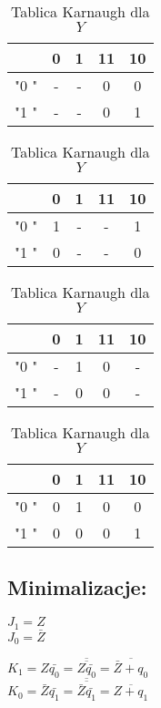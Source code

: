 \documentclass[12pt,a4paper]{article}
\begin{document}
\begin{table}[H]
\begin{minipage}{.5\textwidth}
				\caption{Tablica Karnaugh dla $K_1$}
				\vspace{0.2cm}
				\centering
				\begin{tabular}{c|c|c|c|c}
					\backslashbox{$Z$}{$q_1q_0$}	&	0	&	1	&	11	&	10	\\\hline
					"0	"	&	-	&	-	&	0	&	0	\\\hline
					"1	"	&	-	&	-	&	0	&	1	
				\end{tabular}
			\vspace{1cm}
			
				\caption{Tablica Karnaugh dla $J_0$}
				\vspace{0.2cm}
				\centering
				\begin{tabular}{c|c|c|c|c}
					\backslashbox{$Z$}{$q_1q_0$}	&	0	&	1	&	11	&	10	\\\hline
					"0	"	&	1	&	-	&	-	&	1	\\\hline
					"1	"	&	0	&	-	&	-	&	0	
				\end{tabular}
				
				\caption{Tablica Karnaugh dla $K_0$}
				\vspace{0.2cm}
				\centering
				\begin{tabular}{c|c|c|c|c}
					\backslashbox{$Z$}{$q_1q_0$}	&	0	&	1	&	11	&	10	\\\hline
					"0	"	&	-	&	1	&	0	&	-	\\\hline
					"1	"	&	-	&	0	&	0	&	-	
				\end{tabular}
			\vspace{1cm}
			
				\caption{Tablica Karnaugh dla $Y$}
				\vspace{0.2cm}
				\centering
				\begin{tabular}{c|c|c|c|c}
					\backslashbox{$Z$}{$q_1q_0$}	&	0	&	1	&	11	&	10	\\\hline
					"0	"	&	0	&	1	&	0	&	0	\\\hline
					"1	"	&	0	&	0	&	0	&	1	
				\end{tabular}
			\end{minipage}
			\end{table}
		
		\subsection{Minimalizacje:}
		
		\vspace{1cm}
		\begin{minipage}{.5\textwidth}
			\centering
			\(J_1=Z\)\\
			\(J_0=\bar{Z}\)
			
		\end{minipage}%
		\begin{minipage}{.5\textwidth}
			\centering
			\(K_1	=Z\bar{q_0}	=\overline{\overline{Z\bar{q_0}}}	=\overline{\bar{Z}+q_0}\)\\
			\(K_0	=\bar{Z}\bar{q_1}	=\overline{\overline{\bar{Z}\bar{q_1}}}	=\overline{Z+q_1}\)
		\end{minipage}
		
\end{document}
